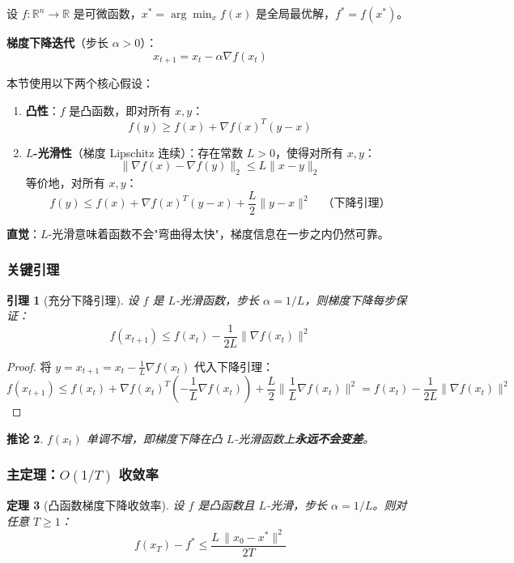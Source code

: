 \documentclass[10pt]{article}
\numberwithin{equation}{section}
\theoremstyle{plain}
\newtheorem{theorem}{定理}[section]
\newtheorem{lemma}[theorem]{引理}
\newtheorem{corollary}[theorem]{推论}
\theoremstyle{definition}
\theoremstyle{remark}
\newcommand{\R}{\mathbb{R}}
\newcommand{\norm}[1]{\lVert #1 \rVert}
\begin{document}
设 $f: \R^n \to \R$ 是可微函数，$x^* = \arg\min_x f(x)$ 是全局最优解，$f^* = f(x^*)$。

\textbf{梯度下降迭代}（步长 $\alpha > 0$）：
\[x_{t+1} = x_t - \alpha \nabla f(x_t)\]

本节使用以下两个核心假设：

\begin{enumerate}
	\item \textbf{凸性}：$f$ 是凸函数，即对所有 $x, y$：
	      \[f(y) \geq f(x) + \nabla f(x)^T (y - x)\]
	\item \textbf{$L$-光滑性}（梯度 Lipschitz 连续）：存在常数 $L > 0$，使得对所有 $x, y$：
	      \[\norm{\nabla f(x) - \nabla f(y)}_2 \leq L \norm{x - y}_2\]
	      等价地，对所有 $x, y$：
	      \[f(y) \leq f(x) + \nabla f(x)^T(y - x) + \frac{L}{2}\norm{y - x}^2 \quad \text{（下降引理）}\]
\end{enumerate}

\begin{RemarkBox}
	\textbf{直觉}：$L$-光滑意味着函数不会"弯曲得太快"，梯度信息在一步之内仍然可靠。
\end{RemarkBox}

\subsubsection{关键引理}

\begin{lemma}[充分下降引理]
	设 $f$ 是 $L$-光滑函数，步长 $\alpha = 1/L$，则梯度下降每步保证：
	\[f(x_{t+1}) \leq f(x_t) - \frac{1}{2L}\norm{\nabla f(x_t)}^2\]
\end{lemma}

\begin{proof}
	将 $y = x_{t+1} = x_t - \frac{1}{L}\nabla f(x_t)$ 代入下降引理：
	\[f(x_{t+1}) \leq f(x_t) + \nabla f(x_t)^T\!\left(-\frac{1}{L}\nabla f(x_t)\right)
		+ \frac{L}{2}\norm{\frac{1}{L}\nabla f(x_t)}^2
		= f(x_t) - \frac{1}{2L}\norm{\nabla f(x_t)}^2\]
\end{proof}

\begin{corollary}
	$f(x_t)$ 单调不增，即梯度下降在凸 $L$-光滑函数上\textbf{永远不会变差}。
\end{corollary}

\subsubsection{主定理：$O(1/T)$ 收敛率}

\begin{theorem}[凸函数梯度下降收敛率]
	设 $f$ 是凸函数且 $L$-光滑，步长 $\alpha = 1/L$。则对任意 $T \geq 1$：
	\[f(x_T) - f^* \leq \frac{L\,\norm{x_0 - x^*}^2}{2T}\]
\end{theorem}
\end{document}
